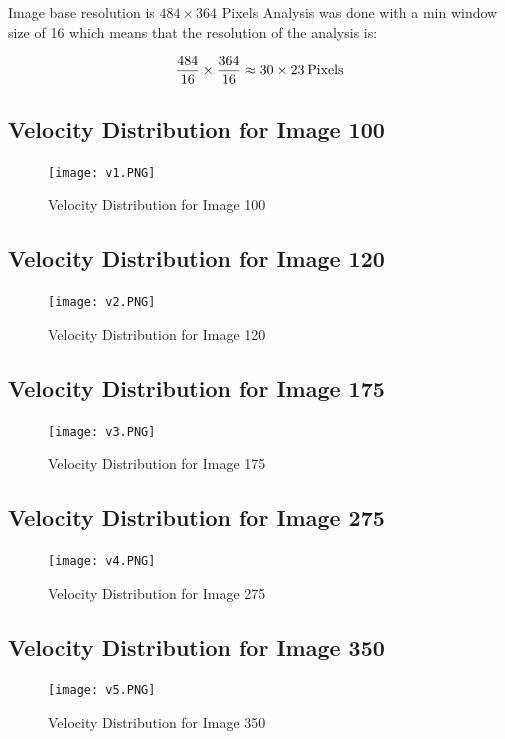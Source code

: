 \documentclass[12pt]{article}
\begin{document}
    
Image base resolution is \(484 \times 364\) Pixels
\newline
Analysis was done with a min window size of 16 which means that the resolution of the analysis is:

\[\frac{484}{16} \times \frac{364}{16} \approx 30 \times 23 \hspace{2 pt} \mbox{Pixels}\]
\subsection{Velocity Distribution for Image 100}
    \begin{figure}[h]
    \texttt{[image: v1.PNG]}
    \centering
    \caption{Velocity Distribution for Image 100}
    \end{figure}
    
    \newpage
    \subsection{Velocity Distribution for Image 120}
    \begin{figure}[h]
    \texttt{[image: v2.PNG]}
    \centering
    \caption{Velocity Distribution for Image 120}
    \end{figure}
    
    \newpage
    \subsection{Velocity Distribution for Image 175}
    \begin{figure}[h]
    \texttt{[image: v3.PNG]}
    \centering
    \caption{Velocity Distribution for Image 175}
    \end{figure}
    
    \newpage
    \subsection{Velocity Distribution for Image 275}
    \begin{figure}[h]
    \texttt{[image: v4.PNG]}
    \centering
    \caption{Velocity Distribution for Image 275}
    \end{figure}
    
    \newpage
    \subsection{Velocity Distribution for Image 350}
    \begin{figure}[h]
    \texttt{[image: v5.PNG]}
    \centering
    \caption{Velocity Distribution for Image 350}
    \end{figure}
        
\end{document}
